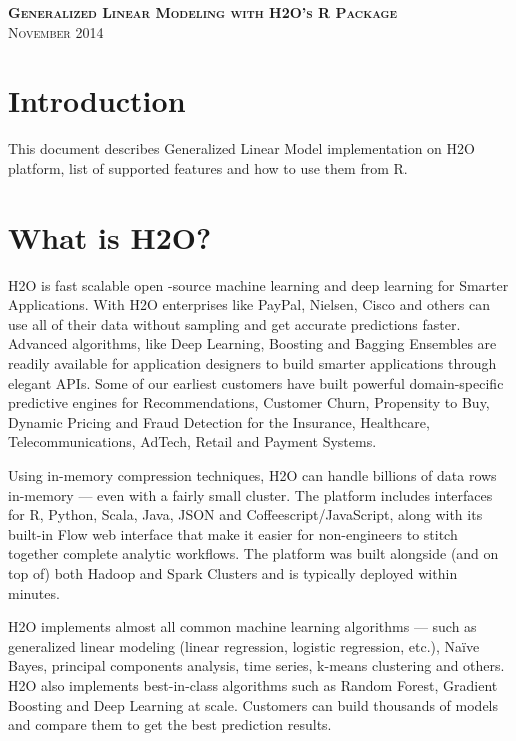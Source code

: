 \documentclass[11pt]{article}
\begin{document}
\thispagestyle{empty} %

\begin{center}
\textsc{\Large\bf{Generalized Linear Modeling  with H2O's R Package}}
\\
\bigskip
\textsc{November 2014}
\end{center}
\bigskip
\bigskip 
\bigskip
\bigskip
\tableofcontents

\newpage

\section{Introduction} \label{1}
This document describes Generalized Linear Model implementation on H2O platform, list of supported features and how to use them from R. 

\section{What is H2O?}

H2O is fast scalable open -source machine learning and deep learning for Smarter Applications. With H2O enterprises like PayPal, Nielsen, Cisco and others can use all of their data without sampling and get accurate predictions faster. Advanced algorithms, like Deep Learning, Boosting and Bagging Ensembles are readily available for application designers to build smarter applications through elegant APIs. Some of our earliest customers have built powerful domain-specific predictive engines for Recommendations, Customer Churn, Propensity to Buy, Dynamic Pricing and Fraud Detection for the Insurance, Healthcare, Telecommunications, AdTech,
Retail and Payment Systems.

Using in-memory compression techniques, H2O can handle billions of data rows in-memory — even with a fairly small cluster. The platform includes interfaces for R, Python, Scala, Java, JSON and Coffeescript/JavaScript, along with its built-in Flow web interface that make it easier for non-engineers to stitch together complete analytic workflows. The platform was built alongside (and on top of) both Hadoop and Spark Clusters and is typically deployed within minutes.

H2O implements almost all common machine learning algorithms — such as generalized linear modeling (linear regression, logistic regression, etc.), Na\"{i}ve Bayes, principal components analysis, time series, k-means clustering and others. H2O also implements best-in-class algorithms such as Random Forest, Gradient Boosting and Deep Learning at scale. Customers can build thousands of models and compare them to get the best prediction results.
\end{document}
